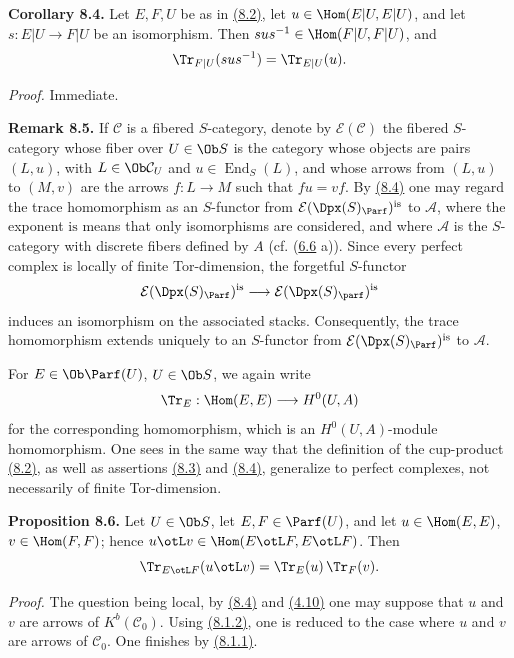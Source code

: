 \textbf{Corollary 8.4.} Let \(E,F,U\) be as in \hyperlink{sga6.e01.para.8-2}{(8.2)}, let \(u\in\Hom(E|U,E|U)\), and let \(s:E|U\to F|U\) be an isomorphism. Then \(sus^{-1}\in\Hom(F|U,F|U)\), and
\[
  \Tr_{F|U}(sus^{-1})=\Tr_{E|U}(u).
\]

\emph{Proof.} Immediate.

\textbf{Remark 8.5.} If \(\mathcal C\) is a fibered \(S\)-category, denote by \(\mathcal E(\mathcal C)\) the fibered \(S\)-category whose fiber over \(U\in\Ob S\) is the category whose objects are pairs \((L,u)\), with \(L\in\Ob\mathcal C_U\) and \(u\in\operatorname{End}_S(L)\), and whose arrows from \((L,u)\) to \((M,v)\) are the arrows \(f:L\to M\) such that \(fu=vf\). By \hyperlink{sga6.e01.cor.8-4}{(8.4)} one may regard the trace homomorphism as an \(S\)-functor from \(\mathcal E(\Dpx(S)_{\Parf})^{\mathrm{is}}\) to \(\mathcal A\), where the exponent \(\mathrm{is}\) means that only isomorphisms are considered, and where \(\mathcal A\) is the \(S\)-category with discrete fibers defined by \(A\) (cf. (\hyperlink{sga6.e01.rem.6-6}{6.6} a)). Since every perfect complex is locally of finite Tor-dimension, the forgetful \(S\)-functor
\[
  \mathcal E(\Dpx(S)_{\Parf})^{\mathrm{is}}
  \longrightarrow
  \mathcal E(\Dpx(S)_{\parf})^{\mathrm{is}}
\]
induces an isomorphism on the associated stacks. Consequently, the trace homomorphism extends uniquely to an \(S\)-functor from \(\mathcal E(\Dpx(S)_{\Parf})^{\mathrm{is}}\) to \(\mathcal A\).

For \(E\in\Ob\Parf(U)\), \(U\in\Ob S\), we again write
\[
  \Tr_E:\Hom(E,E)\longrightarrow H^0(U,A)
\]
for the corresponding homomorphism, which is an \(H^0(U,A)\)-module homomorphism. One sees in the same way that the definition of the cup-product \hyperlink{sga6.e01.para.8-2}{(8.2)}, as well as assertions \hyperlink{sga6.e01.prop.8-3}{(8.3)} and \hyperlink{sga6.e01.cor.8-4}{(8.4)}, generalize to perfect complexes, not necessarily of finite Tor-dimension.

\textbf{Proposition 8.6.} Let \(U\in\Ob S\), let \(E,F\in\Parf(U)\), and let \(u\in\Hom(E,E)\), \(v\in\Hom(F,F)\); hence \(u\otL v\in\Hom(E\otL F,E\otL F)\). Then
\[
  \Tr_{E\otL F}(u\otL v)=\Tr_E(u)\,\Tr_F(v).
\]

\emph{Proof.} The question being local, by \hyperlink{sga6.e01.cor.8-4}{(8.4)} and \hyperlink{sga6.e01.prop.4-10}{(4.10)} one may suppose that \(u\) and \(v\) are arrows of \(K^b(\mathcal C_0)\). Using \hyperlink{sga6.e01.para.8-1-2}{(8.1.2)}, one is reduced to the case where \(u\) and \(v\) are arrows of \(\mathcal C_0\). One finishes by \hyperlink{sga6.e01.para.8-1-1}{(8.1.1)}.


